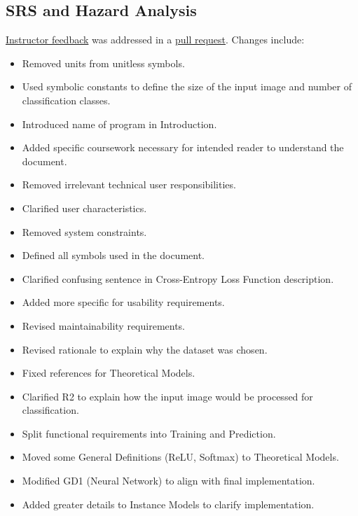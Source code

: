 \documentclass{article}
\begin{document}

\subsection{SRS and Hazard Analysis}

\href{https://github.com/ptrandev/OCRacle/issues/3}{Instructor feedback} was addressed in
a \href{https://github.com/ptrandev/OCRacle/pull/29}{pull request}. Changes include:

\begin{itemize}
  \item Removed units from unitless symbols.
  \item Used symbolic constants to define the size of the input image and number of classification classes.
  \item Introduced name of program in Introduction.
  \item Added specific coursework necessary for intended reader to understand the document.
  \item Removed irrelevant technical user responsibilities.
  \item Clarified user characteristics.
  \item Removed system constraints.
  \item Defined all symbols used in the document.
  \item Clarified confusing sentence in Cross-Entropy Loss Function description.
  \item Added more specific for usability requirements.
  \item Revised maintainability requirements.
  \item Revised rationale to explain why the dataset was chosen.
  \item Fixed references for Theoretical Models.
  \item Clarified R2 to explain how the input image would be processed for classification.
  \item Split functional requirements into Training and Prediction.
  \item Moved some General Definitions (ReLU, Softmax) to Theoretical Models.
  \item Modified GD1 (Neural Network) to align with final implementation.
  \item Added greater details to Instance Models to clarify implementation.
\end{itemize}
\end{document}
